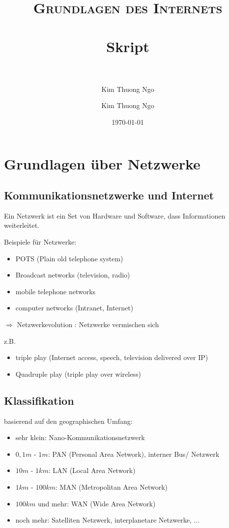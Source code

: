 \documentclass[paper=a4, fontsize=11pt]{scrartcl}
\author{Kim Thuong Ngo}
\title{	
\normalfont \normalsize 
\textsc{Grundlagen des Internets} \\ [25pt] 
\horrule{0.5pt} \\[0.4cm] 
\huge Skript \\ 
\horrule{2pt} \\[0.5cm] 
}
\author{Kim Thuong Ngo}
\date{\normalsize\today}
\numberwithin{equation}{section}
\numberwithin{figure}{section}
\numberwithin{table}{section}
\begin{document}
\maketitle 

\newpage

\tableofcontents

\newpage


\section{Grundlagen über Netzwerke}


\subsection{Kommunikationsnetzwerke und Internet}

Ein Netzwerk ist ein Set von Hardware und Software, dass Informationen weiterleitet.

Beispiele für Netzwerke:
\begin{itemize}
\item POTS (Plain old telephone system)
\item Broadcast networks (television, radio)
\item mobile telephone networks
\item computer networks (Intranet, Internet) 
\end{itemize}

$\Rightarrow$ Netzwerkevolution : Netzwerke vermischen sich

z.B.
\begin{itemize}
\item triple play (Internet access, speech, television delivered over IP)
\item Quadruple play (triple play over wireless)
\end{itemize}


\subsection{Klassifikation}

basierend auf den geographischen Umfang:
\begin{itemize}
\item sehr klein: Nano-Kommunikationsnetzwerk
\item $0,1 m$ - $1 m$: PAN (Personal Area Network), interner Bus/ Netzwerk
\item $10 m$ - $1 km$: LAN (Local Area Network)
\item $1 km$ - $100 km$: MAN (Metropolitan Area Network)
\item $100km$ und mehr: WAN (Wide Area Network)
\item noch mehr: Satelliten Netzwerk, interplanetare Netzwerke, ...
\end{itemize}
\end{document}
